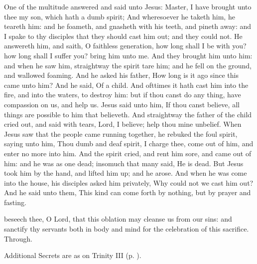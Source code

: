  One of the multitude answered and said unto Jesus: Master, I have brought unto thee my son, which hath a dumb spirit; And wheresoever he taketh him, he teareth him: and he foameth, and gnasheth with his teeth, and pineth away: and I spake to thy disciples that they should cast him out; and they could not. He answereth him, and saith, O faithless generation, how long shall I be with you? how long shall I suffer you? bring him unto me. And they brought him unto him: and when he saw him, straightway the spirit tare him; and he fell on the ground, and wallowed foaming. And he asked his father, How long is it ago since this came unto him? And he said, Of a child. And ofttimes it hath cast him into the fire, and into the waters, to destroy him: but if thou canst do any thing, have compassion on us, and help us. Jesus said unto him, If thou canst believe, all things are possible to him that believeth. And straightway the father of the child cried out, and said with tears, Lord, I believe; help thou mine unbelief. When Jesus saw that the people came running together, he rebuked the foul spirit, saying unto him, Thou dumb and deaf spirit, I charge thee, come out of him, and enter no more into him. And the spirit cried, and rent him sore, and came out of him: and he was as one dead; insomuch that many said, He is dead. But Jesus took him by the hand, and lifted him up; and he arose. And when he was come into the house, his disciples asked him privately, Why could not we cast him out? And he said unto them, This kind can come forth by nothing, but by prayer and fasting.

\clearpage


\secret
{} beseech thee, O Lord, that this oblation may cleanse us from our sins: and sanctify thy servants both in body and mind for the celebration of this sacrifice. Through.
\begin{rubric}
    Additional Secrets are as on Trinity III (p. \pageref{TrinityIIISecret}).
\end{rubric}


